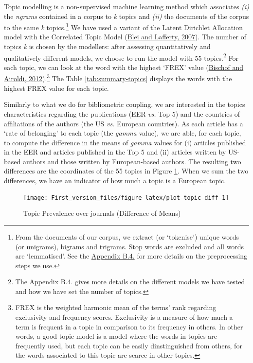 \documentclass[]{elsarticle} %
\begin{document}
Topic modelling is a non-supervised machine learning method which
associates \emph{(i)} the \emph{ngrams} contained in a corpus to
\emph{k} topics and \emph{(ii)} the documents of the corpus to the same
\emph{k} topics.\footnote{From the documents of our corpus, we extract
  (or `tokenise') unique words (or unigrams), bigrams and trigrams. Stop
  words are excluded and all words are `lemmatised'. See the
  \protect\hyperlink{topic}{Appendix B.4.} for more details on the
  preprocessing steps we use.} We have used a variant of the Latent
Dirichlet Allocation model with the Correlated Topic Model
(\protect\hyperlink{ref-blei2007}{Blei and Lafferty, 2007}). The number
of topics \emph{k} is chosen by the modellers: after assessing
quantitatively and qualitatively different models, we choose to run the
model with 55 topics.\footnote{The \protect\hyperlink{topic}{Appendix
  B.4.} gives more details on the different models we have tested and
  how we have set the number of topics.} For each topic, we can look at
the word with the highest `FREX' value
(\protect\hyperlink{ref-bischof2012}{Bischof and Airoldi,
2012}).\footnote{FREX is the weighted harmonic mean of the terms' rank
  regarding exclusivity and frequency scores. Exclusivity is a measure
  of how much a term is frequent in a topic in comparison to its
  frequency in others. In other words, a good topic model is a model
  where the words in topics are frequently used, but each topic can be
  easily dinstinguished from others, for the words associated to this
  topic are scarce in other topics.} The Table \ref{tab:summary-topics}
displays the words with the highest FREX value for each topic.

Similarly to what we do for bibliometric coupling, we are interested in
the topics characteristics regarding the publications (EER \emph{vs.}
Top 5) and the countries of affiliations of the authors (the US
\emph{vs.} European countries). As each article has a `rate of
belonging' to each topic (the \emph{gamma} value), we are able, for each
topic, to compute the difference in the means of \emph{gamma} values for
(i) articles published in the EER and articles published in the Top 5
and (ii) articles written by US-based authors and those written by
European-based authors. The resulting two differences are the
coordinates of the 55 topics in Figure \ref{fig:plot-topic-diff}. When
we sum the two differences, we have an indicator of how much a topic is
a European topic.

\begin{figure}[h]

{\centering \texttt{[image: First\_version\_files/figure-latex/plot-topic-diff-1]} 

}

\caption{Topic Prevalence over journals (Difference of Means)}\label{fig:plot-topic-diff}
\end{figure}
\end{document}
